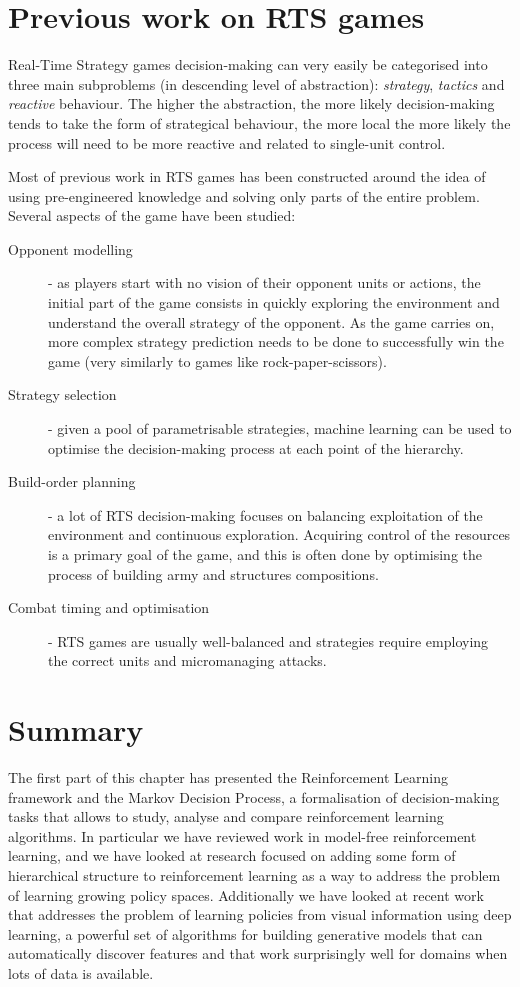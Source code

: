 \section{Previous work on RTS games}

Real-Time Strategy games decision-making can very easily be categorised into
three main subproblems (in descending level of abstraction): \emph{strategy},
\emph{tactics} and \emph{reactive} behaviour. The higher the abstraction, the
more likely decision-making tends to take the form of strategical behaviour, the
more local the more likely the process will need to be more reactive and related
to single-unit control.

Most of previous work in RTS games has been constructed around the idea of using
pre-engineered knowledge and solving only parts of the entire problem. Several
aspects of the game have been studied:

\begin{description}
\item [Opponent modelling] - as players start with no vision of their opponent
  units or actions, the initial part of the game consists in quickly exploring
  the environment and understand the overall strategy of the opponent. As the
  game carries on, more complex strategy prediction needs to be done to
  successfully win the game (very similarly to games like rock-paper-scissors). 
\item [Strategy selection] - given a pool of parametrisable strategies, machine
  learning can be used to optimise the decision-making process at each point of
  the hierarchy.
\item [Build-order planning] - a lot of RTS decision-making focuses on balancing
  exploitation of the environment and continuous exploration. Acquiring control
  of the resources is a primary goal of the game, and this is often done by
  optimising the process of building army and structures compositions.
\item [Combat timing and optimisation] - RTS games are usually well-balanced and
  strategies require employing the correct units and micromanaging attacks.  
\end{description}

\section{Summary}

The first part of this chapter has presented the Reinforcement Learning
framework and the Markov Decision Process, a formalisation of decision-making
tasks that allows to study, analyse and compare reinforcement learning
algorithms. In particular we have reviewed work in model-free reinforcement
learning, and we have looked at research focused on adding some form of
hierarchical structure to reinforcement learning as a way to address the problem
of learning growing policy spaces. Additionally we have looked at recent work
that addresses the problem of learning policies from visual information using
deep learning, a powerful set of algorithms for building generative models that
can automatically discover features and that work surprisingly well for domains
when lots of data is available.

